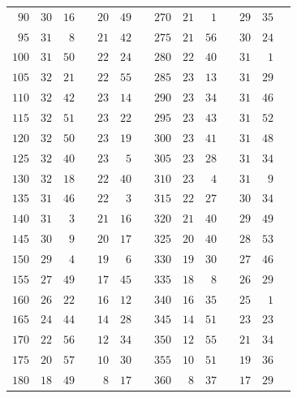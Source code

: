 \begin{center}
\begin{tabular}{r|rrl|rrl||r|rrl|rrl}
$90$&$30$&$16$&&$20$&$49$&&$270$&$21$&$1$&&$29$&$35$&\\[3pt]
$95$&$31$&$8$&&$21$&$42$&&$275$&$21$&$56$&&$30$&$24$&\\
$100$&$31$&$50$&&$22$&$24$&&$280$&$22$&$40$&&$31$&$1$&\\
$105$&$32$&$21$&&$22$&$55$&&$285$&$23$&$13$&&$31$&$29$&\\
$110$&$32$&$42$&&$23$&$14$&&$290$&$23$&$34$&&$31$&$46$&\\
$115$&$32$&$51$&&$23$&$22$&&$295$&$23$&$43$&&$31$&$52$&\\
$120$&$32$&$50$&&$23$&$19$&&$300$&$23$&$41$&&$31$&$48$&\\[3pt]
$125$&$32$&$40$&&$23$&$5$&&$305$&$23$&$28$&&$31$&$34$&\\
$130$&$32$&$18$&&$22$&$40$&&$310$&$23$&$4$&&$31$&$9$&\\
$135$&$31$&$46$&&$22$&$3$&&$315$&$22$&$27$&&$30$&$34$&\\
$140$&$31$&$3$&&$21$&$16$&&$320$&$21$&$40$&&$29$&$49$&\\
$145$&$30$&$9$&&$20$&$17$&&$325$&$20$&$40$&&$28$&$53$&\\
$150$&$29$&$4$&&$19$&$6$&&$330$&$19$&$30$&&$27$&$46$&\\[3pt]
$155$&$27$&$49$&&$17$&$45$&&$335$&$18$&$8$&&$26$&$29$&\\
$160$&$26$&$22$&&$16$&$12$&&$340$&$16$&$35$&&$25$&$1$&\\
$165$&$24$&$44$&&$14$&$28$&&$345$&$14$&$51$&&$23$&$23$&\\
$170$&$22$&$56$&&$12$&$34$&&$350$&$12$&$55$&&$21$&$34$&\\
$175$&$20$&$57$&&$10$&$30$&&$355$&$10$&$51$&&$19$&$36$&\\
$180$&$18$&$49$&&$8$&$17$&&$360$&$8$&$37$&&$17$&$29$&\\
\end{tabular}
\endgroup
\end{center}
